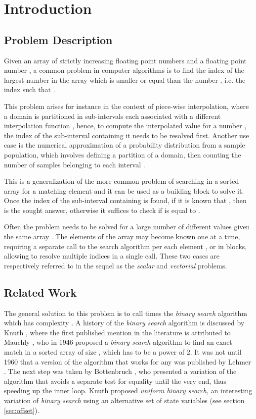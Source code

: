 \documentclass[preprint,1p,times]{elsarticle}
\begin{document}
\section{Introduction}
\label{sec:introduction}


\subsection{Problem Description}

Given an array  of strictly increasing floating point numbers   
and a floating point number ,
a common problem in computer algorithms is to find the index of the largest number in the array  which is smaller or equal than the number , i.e. the index  such that .

This problem arises for instance in the context of piece-wise interpolation, where a domain  
is partitioned in sub-intervals  each associated with a different interpolation function , hence, to compute the interpolated value for a number
, the index  of the sub-interval containing it needs to be resolved first.
Another use case is the numerical approximation of a probability distribution from a sample population, which involves defining a partition  of a domain, then counting the number of samples belonging to each interval .

This is a generalization of the more common problem of searching in a sorted array for a matching element and it can be used as a building block to solve it. Once the index  of the sub-interval  containing  is found, if it is known that , then  is the sought answer, otherwise it suffices to check if  is equal to . 

Often the problem needs to be solved for a large number  of different values  given the same array .
The elements of the array  may become known one at a time, requiring a separate call to the search algorithm per each element , or in blocks, allowing to resolve multiple indices in a single call. These two  cases are respectively referred to in the sequel as the \textit{scalar} and \textit{vectorial} problems.

\subsection{Related Work}
\label{sec:relatedwork}
The general solution to this problem is to call  times the \textit{binary search} algorithm which has complexity . A history of the \textit{binary search} algorithm is discussed by Knuth \cite{Knuth1997}, where the first published mention in the literature is attributed to Mauchly \cite{Mauchly1946}, who in 1946 proposed a \textit{binary search} algorithm to find an exact match in a sorted array of size , which has to be a power of 2. It was not until 1960 that a version of the algorithm that works for any  was published by Lehmer \cite{Lehmer1960}. The next step was taken by Bottenbruch \cite{Bottenbruch1962}, who presented a variation of the algorithm that avoids a separate test for equality until the very end, thus speeding up the inner loop. Knuth \cite{Knuth1997} proposed \textit{uniform binary search}, an interesting variation of \textit{binary search} using an alternative set of state variables (see section \ref{sec:offset}).
 
\end{document}
